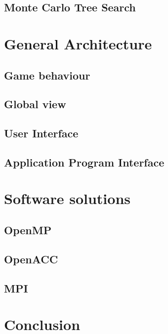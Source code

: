 \documentclass[12pt]{article}
\begin{document}
	\subsection{Monte Carlo Tree Search}			\label{sec:mcts}			
\newpage

\section{General Architecture}					\label{sec:generalArchitecture} 		
	\subsection{Game behaviour}				\label{sec:gameBehavioiur}		
	\subsection{Global view}				\label{sec:globalview}		
	\subsection{User Interface}				\label{sec:ui}				
	\subsection{Application Program Interface}		\label{sec:api}				
\newpage

\section{Software solutions}					\label{sec:softwareSolutions}
	\subsection{OpenMP}					\label{sec:openmp}			
	\subsection{OpenACC}					\label{sec:openacc}			
	\subsection{MPI}					\label{sec:mpi}				
\newpage

\section{Conclusion}						\label{sec:conclusion}			
\newpage

%
%
\end{document}

